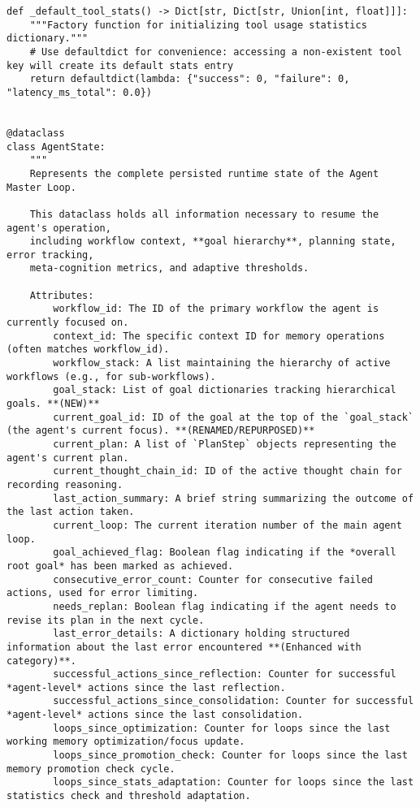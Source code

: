 \documentclass[12pt,a4paper]{article}
\begin{document}
\begin{pageablecode}
\begin{verbatim}
def _default_tool_stats() -> Dict[str, Dict[str, Union[int, float]]]:
    """Factory function for initializing tool usage statistics dictionary."""
    # Use defaultdict for convenience: accessing a non-existent tool key will create its default stats entry
    return defaultdict(lambda: {"success": 0, "failure": 0, "latency_ms_total": 0.0})


@dataclass
class AgentState:
    """
    Represents the complete persisted runtime state of the Agent Master Loop.

    This dataclass holds all information necessary to resume the agent's operation,
    including workflow context, **goal hierarchy**, planning state, error tracking,
    meta-cognition metrics, and adaptive thresholds.

    Attributes:
        workflow_id: The ID of the primary workflow the agent is currently focused on.
        context_id: The specific context ID for memory operations (often matches workflow_id).
        workflow_stack: A list maintaining the hierarchy of active workflows (e.g., for sub-workflows).
        goal_stack: List of goal dictionaries tracking hierarchical goals. **(NEW)**
        current_goal_id: ID of the goal at the top of the `goal_stack` (the agent's current focus). **(RENAMED/REPURPOSED)**
        current_plan: A list of `PlanStep` objects representing the agent's current plan.
        current_thought_chain_id: ID of the active thought chain for recording reasoning.
        last_action_summary: A brief string summarizing the outcome of the last action taken.
        current_loop: The current iteration number of the main agent loop.
        goal_achieved_flag: Boolean flag indicating if the *overall root goal* has been marked as achieved.
        consecutive_error_count: Counter for consecutive failed actions, used for error limiting.
        needs_replan: Boolean flag indicating if the agent needs to revise its plan in the next cycle.
        last_error_details: A dictionary holding structured information about the last error encountered **(Enhanced with category)**.
        successful_actions_since_reflection: Counter for successful *agent-level* actions since the last reflection.
        successful_actions_since_consolidation: Counter for successful *agent-level* actions since the last consolidation.
        loops_since_optimization: Counter for loops since the last working memory optimization/focus update.
        loops_since_promotion_check: Counter for loops since the last memory promotion check cycle.
        loops_since_stats_adaptation: Counter for loops since the last statistics check and threshold adaptation.

\end{verbatim}
\end{pageablecode}
\end{document}
